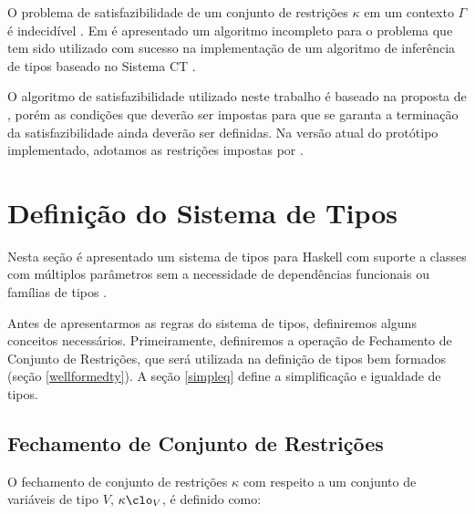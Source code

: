 O problema de satisfazibilidade de um conjunto de restri\c{c}\~oes $\kappa$ em um contexto $\Gamma$ \'e indecid\'ivel 
\cite{Volpano91}. Em \cite{Camarao04} \'e apresentado um algoritmo incompleto para o problema que tem sido utilizado
com sucesso na implementa\c{c}\~ao de um algoritmo de infer\^encia de tipos baseado no Sistema CT 
\cite{Camarao07, Camarao99a}.

O algoritmo de satisfazibilidade utilizado neste trabalho \'e baseado na proposta de \cite{Camarao04}, por\'em 
as condi\c{c}\~oes que dever\~ao ser impostas para que se garanta a termina\c{c}\~ao da satisfazibilidade ainda 
dever\~ao ser definidas. Na vers\~ao atual do prot\'otipo implementado, adotamos as restri\c{c}\~oes impostas por 
\cite{Sulzmann06a}. 

\section{Defini\c{c}\~ao do Sistema de Tipos}\label{sistema}

Nesta se\c{c}\~ao \'e apresentado um sistema de tipos para Haskell com suporte a classes com m\'ultiplos par\^ametros
sem a necessidade de depend\^encias funcionais ou fam\'ilias de tipos \cite{Camarao09}. 

Antes de apresentarmos as regras do sistema de tipos, definiremos alguns conceitos necess\'arios.
Primeiramente, definiremos a opera\c{c}\~ao de Fechamento de Conjunto de Restri\c{c}\~oes, que ser\'a utilizada na 
defini\c{c}\~ao de tipos bem formados (se\c{c}\~ao \ref{wellformedty}). A se\c{c}\~ao \ref{simpleq} define a 
simplifica\c{c}\~ao e igualdade de tipos.

\subsection{Fechamento de Conjunto de Restri\c{c}\~oes}\label{closure}

O fechamento de conjunto de restri\c{c}\~oes $\kappa$ com respeito a um conjunto de vari\'aveis de tipo $V$, 
$\kappa\clo_{V}$, \'e definido como: 

